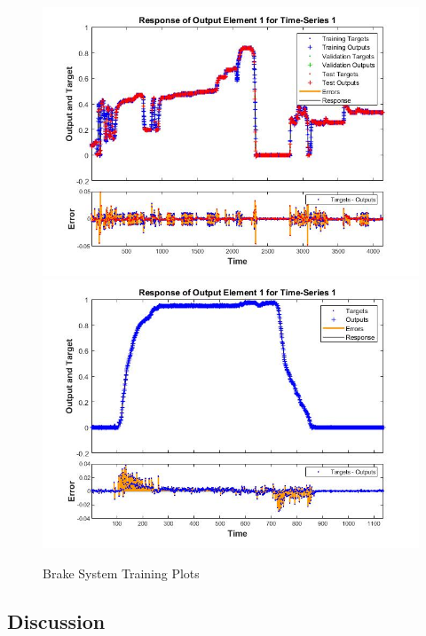 \documentclass[conference]{IEEEtran}
\begin{document}
\begin{figure}[h]
	\centering
		{\includegraphics[width=0.90\linewidth]{figs/img/brake_new_neuralNetworkFig}}
		{\includegraphics[width=0.90\linewidth]{figs/img/brake_new_neuralNetworkFigLog2Test}}
	\caption{Brake System Training Plots}
\end{figure}





\subsection{Discussion}
\label{sec:discussion}
\end{document}
